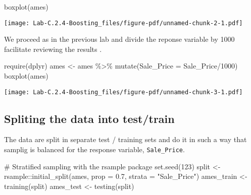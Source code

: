 \documentclass[
  letterpaper,
  DIV=11,
  numbers=noendperiod,
  oneside]{scrartcl}
\newenvironment{Shaded}{\begin{snugshade}}{\end{snugshade}}
\newcommand{\AttributeTok}[1]{\textcolor[rgb]{0.40,0.45,0.13}{#1}}
\newcommand{\CommentTok}[1]{\textcolor[rgb]{0.37,0.37,0.37}{#1}}
\newcommand{\DecValTok}[1]{\textcolor[rgb]{0.68,0.00,0.00}{#1}}
\newcommand{\FloatTok}[1]{\textcolor[rgb]{0.68,0.00,0.00}{#1}}
\newcommand{\FunctionTok}[1]{\textcolor[rgb]{0.28,0.35,0.67}{#1}}
\newcommand{\NormalTok}[1]{\textcolor[rgb]{0.00,0.23,0.31}{#1}}
\newcommand{\OtherTok}[1]{\textcolor[rgb]{0.00,0.23,0.31}{#1}}
\newcommand{\SpecialCharTok}[1]{\textcolor[rgb]{0.37,0.37,0.37}{#1}}
\newcommand{\StringTok}[1]{\textcolor[rgb]{0.13,0.47,0.30}{#1}}
\begin{document}
\begin{Shaded}
\begin{Highlighting}[]
\FunctionTok{boxplot}\NormalTok{(ames)}
\end{Highlighting}
\end{Shaded}

\texttt{[image: Lab-C.2.4-Boosting\_files/figure-pdf/unnamed-chunk-2-1.pdf]}

We proceed as in the previous lab and divide the reponse variable by
1000 facilitate reviewing the results .

\begin{Shaded}
\begin{Highlighting}[]
\FunctionTok{require}\NormalTok{(dplyr)}
\NormalTok{ames }\OtherTok{\textless{}{-}}\NormalTok{ ames }\SpecialCharTok{\%\textgreater{}\%} \FunctionTok{mutate}\NormalTok{(}\AttributeTok{Sale\_Price =}\NormalTok{ Sale\_Price}\SpecialCharTok{/}\DecValTok{1000}\NormalTok{)}
\FunctionTok{boxplot}\NormalTok{(ames)}
\end{Highlighting}
\end{Shaded}

\texttt{[image: Lab-C.2.4-Boosting\_files/figure-pdf/unnamed-chunk-3-1.pdf]}

\subsection{Spliting the data into
test/train}\label{spliting-the-data-into-testtrain}

The data are split in separate test / training sets and do it in such a
way that samplig is balanced for the response variable,
\texttt{Sale\_Price}.

\begin{Shaded}
\begin{Highlighting}[]
\CommentTok{\# Stratified sampling with the rsample package}
\FunctionTok{set.seed}\NormalTok{(}\DecValTok{123}\NormalTok{)}
\NormalTok{split }\OtherTok{\textless{}{-}}\NormalTok{ rsample}\SpecialCharTok{::}\FunctionTok{initial\_split}\NormalTok{(ames, }\AttributeTok{prop =} \FloatTok{0.7}\NormalTok{, }
                       \AttributeTok{strata =} \StringTok{"Sale\_Price"}\NormalTok{)}
\NormalTok{ames\_train  }\OtherTok{\textless{}{-}} \FunctionTok{training}\NormalTok{(split)}
\NormalTok{ames\_test   }\OtherTok{\textless{}{-}} \FunctionTok{testing}\NormalTok{(split)}
\end{Highlighting}
\end{Shaded}
\end{document}
